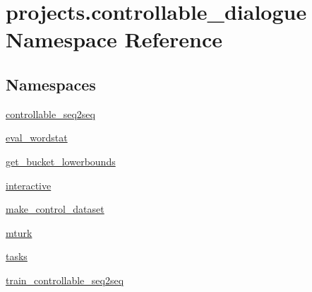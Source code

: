 \hypertarget{namespaceprojects_1_1controllable__dialogue}{}\section{projects.\+controllable\+\_\+dialogue Namespace Reference}
\label{namespaceprojects_1_1controllable__dialogue}
\subsection*{Namespaces}
\begin{DoxyCompactItemize}
\item 
 \hyperlink{namespaceprojects_1_1controllable__dialogue_1_1controllable__seq2seq}{controllable\+\_\+seq2seq}
\item 
 \hyperlink{namespaceprojects_1_1controllable__dialogue_1_1eval__wordstat}{eval\+\_\+wordstat}
\item 
 \hyperlink{namespaceprojects_1_1controllable__dialogue_1_1get__bucket__lowerbounds}{get\+\_\+bucket\+\_\+lowerbounds}
\item 
 \hyperlink{namespaceprojects_1_1controllable__dialogue_1_1interactive}{interactive}
\item 
 \hyperlink{namespaceprojects_1_1controllable__dialogue_1_1make__control__dataset}{make\+\_\+control\+\_\+dataset}
\item 
 \hyperlink{namespaceprojects_1_1controllable__dialogue_1_1mturk}{mturk}
\item 
 \hyperlink{namespaceprojects_1_1controllable__dialogue_1_1tasks}{tasks}
\item 
 \hyperlink{namespaceprojects_1_1controllable__dialogue_1_1train__controllable__seq2seq}{train\+\_\+controllable\+\_\+seq2seq}
\end{DoxyCompactItemize}
